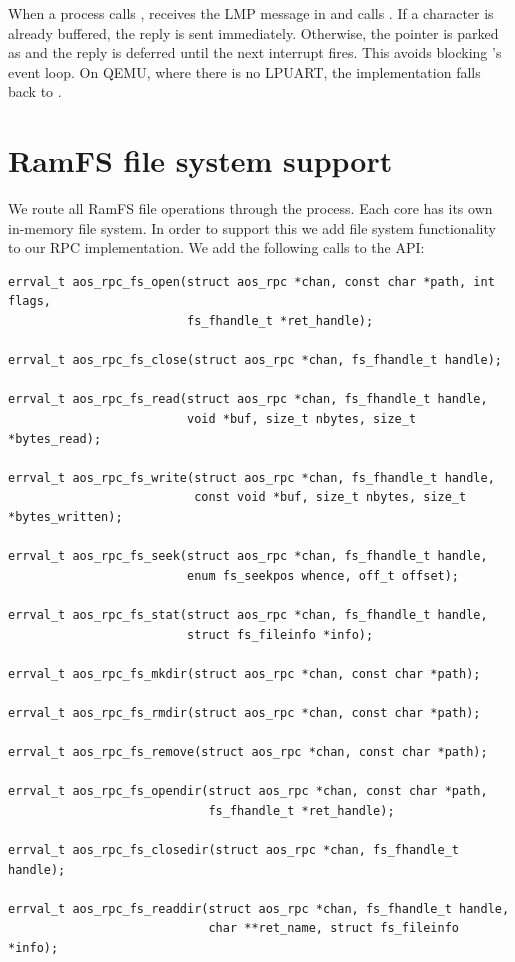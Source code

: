 \medskip\noindent
When a process calls ,  receives the LMP message
in  and calls . If a character is already
buffered, the reply is sent immediately. Otherwise, the  pointer is parked
as  and the reply is deferred until the next interrupt fires. This avoids
blocking 's event loop. On QEMU, where there is no LPUART, the implementation falls
back to .

\section{RamFS file system support}
We route all RamFS file operations through the  process. Each core has its own
in-memory file system. In order to support this we add file system functionality to
our RPC implementation. We add the following calls to the  API:
\begin{lstlisting}
errval_t aos_rpc_fs_open(struct aos_rpc *chan, const char *path, int flags,
                         fs_fhandle_t *ret_handle);

errval_t aos_rpc_fs_close(struct aos_rpc *chan, fs_fhandle_t handle);

errval_t aos_rpc_fs_read(struct aos_rpc *chan, fs_fhandle_t handle,
                         void *buf, size_t nbytes, size_t *bytes_read);

errval_t aos_rpc_fs_write(struct aos_rpc *chan, fs_fhandle_t handle,
                          const void *buf, size_t nbytes, size_t *bytes_written);

errval_t aos_rpc_fs_seek(struct aos_rpc *chan, fs_fhandle_t handle,
                         enum fs_seekpos whence, off_t offset);

errval_t aos_rpc_fs_stat(struct aos_rpc *chan, fs_fhandle_t handle,
                         struct fs_fileinfo *info);

errval_t aos_rpc_fs_mkdir(struct aos_rpc *chan, const char *path);

errval_t aos_rpc_fs_rmdir(struct aos_rpc *chan, const char *path);

errval_t aos_rpc_fs_remove(struct aos_rpc *chan, const char *path);

errval_t aos_rpc_fs_opendir(struct aos_rpc *chan, const char *path,
                            fs_fhandle_t *ret_handle);

errval_t aos_rpc_fs_closedir(struct aos_rpc *chan, fs_fhandle_t handle);

errval_t aos_rpc_fs_readdir(struct aos_rpc *chan, fs_fhandle_t handle,
                            char **ret_name, struct fs_fileinfo *info);

\end{lstlisting}
